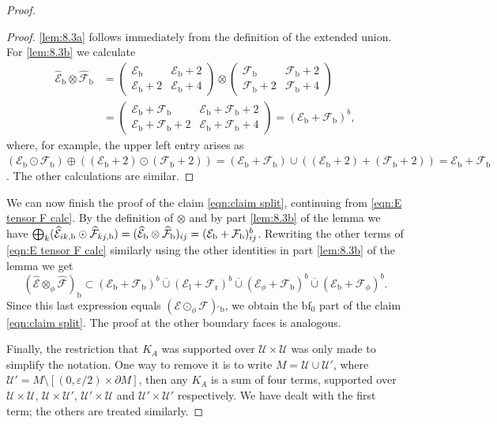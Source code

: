 \documentclass[11pt]{article}
\numberwithin{equation}{section}
\theoremstyle{plain}
\theoremstyle{definition}
\newcommand{\Umath}{{\mathscr{U}}}
\newcommand\calE{{\mathcal E}}
\newcommand\calF{{\mathcal F}}
\newcommand{\calEwhat}{{\widehat{\calE}}}
\newcommand{\calFwhat}{{\widehat{\calF}}}
\newcommand{\bb}{{\mathrm{b}}}
\renewcommand{\ll}{{\mathrm{l}}}
\newcommand{\rr}{{\mathrm{r}}}
\newcommand{\bbf}{{\mathrm{bf}}}
\newcommand{\dM}{{\partial M}}
\newcommand{\ocup}{\mathbin{\overline{\cup}}}
\let\eps\varepsilon
\begin{document}
\begin{proof}
\begin{proof}
\eqref{lem:8.3a} follows immediately from the definition of the extended union. For \eqref{lem:8.3b} we calculate
\begin{align*}
\calEwhat_\bb\otimes \calFwhat_\bb
&=
\begin{pmatrix}
\calE_\bb & \calE_\bb+2 \\
\calE_\bb+2 & \calE_\bb+4
\end{pmatrix}
\otimes
\begin{pmatrix}
\calF_\bb & \calF_\bb+2 \\
\calF_\bb+2 & \calF_\bb+4
\end{pmatrix}
\\ &=
\begin{pmatrix}
\calE_\bb+\calF_\bb & \calE_\bb+\calF_\bb+2 \\
\calE_\bb+\calF_\bb+2 & \calE_\bb+\calF_\bb+4
\end{pmatrix}
= (\calE_\bb+\calF_\bb)^b,
\end{align*}
where, for example, the upper left entry arises as
$(\calE_\bb \odot \calF_\bb) \oplus
((\calE_\bb+2) \odot (\calF_\bb+2))
=
(\calE_\bb + \calF_\bb) \cup
((\calE_\bb+2) + (\calF_\bb+2))
= \calE_\bb + \calF_\bb$.
The other calculations are similar.
\end{proof}
We can now finish the proof of the claim \eqref{eqn:claim split}, continuing from \eqref{eqn:E tensor F calc}. By the definition of $\otimes$ and by part \eqref{lem:8.3b} of the lemma we have
$ \bigoplus_k (\calEwhat_{ik,\bb} \odot \calFwhat_{kj,\bb}) = (\calEwhat_\bb\otimes\nobreak\calFwhat_\bb)_{ij} = (\calE_\bb+\calF_\bb)^b_{ij}$.
Rewriting the other terms of \eqref{eqn:E tensor F calc} similarly using the other identities in part \eqref{lem:8.3b} of the lemma we get\vspace*{-3pt}
\[
(\calEwhat \otimes_\phi \calFwhat)_\bb \subset
(\calE_\bb+\calF_\bb)^b \ocup (\calE_\ll+\calF_\rr)^b \ocup (\calE_\phi+\calF_\bb)^b \ocup (\calE_\bb+\calF_\phi)^b.
\]
Since this last expression equals $(\calE\odot_\phi \calF)\,\widehat{}_\bb$,
we obtain the $\bbf_0$ part of the claim \eqref{eqn:claim split}.
The proof at the other boundary faces is analogous.

Finally, the restriction that $K_A$ was supported over $\Umath\times\Umath$ was only made to simplify the notation. One way to remove it is to write $M=\Umath\cup\Umath'$, where \hbox{$\Umath'=M\setminus[(0,\eps/2)\times\dM]$}, then any $K_A$ is a sum of four terms, supported over $\Umath\times\Umath$, $\Umath\times\Umath'$, $\Umath'\times\Umath$
and $\Umath'\times\Umath'$ respectively. We have dealt with the first term; the others are treated similarly.
\end{proof}
\end{document}
